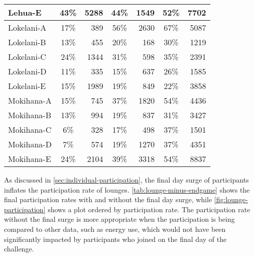 \begin{table}[htbp]
\begin{tabular}{ l | c | r | c | r | c | r |}
		\multicolumn{1}{|l|}{Lehua-E} & 43\% & \textbf{5288} & 44\% & 1549 & 52\% & 7702 \\ \hline
		\multicolumn{1}{|l|}{Lokelani-A} & 17\% & 389 & 56\% & 2630 & 67\% & 5087 \\ \hline
		\multicolumn{1}{|l|}{Lokelani-B} & 13\% & 455 & 20\% & 168 & 30\% & 1219 \\ \hline
		\multicolumn{1}{|l|}{Lokelani-C} & 24\% & 1344 & 31\% & 598 & 35\% & 2391 \\ \hline
		\multicolumn{1}{|l|}{Lokelani-D} & 11\% & 335 & 15\% & 637 & 26\% & 1585 \\ \hline
		\multicolumn{1}{|l|}{Lokelani-E} & 15\% & 1989 & 19\% & 849 & 22\% & 3858 \\ \hline
		\multicolumn{1}{|l|}{Mokihana-A} & 15\% & 745 & 37\% & 1820 & 54\% & 4436 \\ \hline
		\multicolumn{1}{|l|}{Mokihana-B} & 13\% & 994 & 19\% & 837 & 31\% & 3427 \\ \hline
		\multicolumn{1}{|l|}{Mokihana-C} & 6\% & 328 & 17\% & 498 & 37\% & 1501 \\ \hline
		\multicolumn{1}{|l|}{Mokihana-D} & 7\% & 574 & 19\% & 1270 & 37\% & 4351 \\ \hline
		\multicolumn{1}{|l|}{Mokihana-E} & 24\% & 2104 & 39\% & 3318 & 54\% & 8837 \\ \hline
	\end{tabular}
\end{table}

As discussed in \autoref{sec:individual-participation}, the final day surge of participants inflates the participation rate of lounges. \autoref{tab:lounge-minus-endgame} shows the final participation rates with and without the final day surge, while \autoref{fig:lounge-participation} shows a plot ordered by participation rate. The participation rate without the final surge is more appropriate when the participation is being compared to other data, such as energy use, which would not have been significantly impacted by participants who joined on the final day of the challenge.

